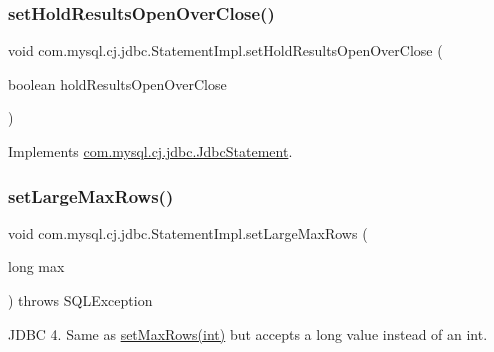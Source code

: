 \subsubsection{\texorpdfstring{set\+Hold\+Results\+Open\+Over\+Close()}{setHoldResultsOpenOverClose()}}
{\footnotesize\ttfamily void com.\+mysql.\+cj.\+jdbc.\+Statement\+Impl.\+set\+Hold\+Results\+Open\+Over\+Close (\begin{DoxyParamCaption}\item[{boolean}]{hold\+Results\+Open\+Over\+Close }\end{DoxyParamCaption})}



Implements \mbox{\hyperlink{interfacecom_1_1mysql_1_1cj_1_1jdbc_1_1_jdbc_statement_acf4340a52d236d444fa9584b3f9cc43b}{com.\+mysql.\+cj.\+jdbc.\+Jdbc\+Statement}}.

\mbox{\label{classcom_1_1mysql_1_1cj_1_1jdbc_1_1_statement_impl_adcb9676c5158982c94c3213a11feeb17}} 
\subsubsection{\texorpdfstring{set\+Large\+Max\+Rows()}{setLargeMaxRows()}}
{\footnotesize\ttfamily void com.\+mysql.\+cj.\+jdbc.\+Statement\+Impl.\+set\+Large\+Max\+Rows (\begin{DoxyParamCaption}\item[{long}]{max }\end{DoxyParamCaption}) throws S\+Q\+L\+Exception}

J\+D\+BC 4. Same as \mbox{\hyperlink{classcom_1_1mysql_1_1cj_1_1jdbc_1_1_statement_impl_ab0226070ba29ae3c0cf7431d7b902c01}{set\+Max\+Rows(int)}} but accepts a long value instead of an int. \mbox{\label{classcom_1_1mysql_1_1cj_1_1jdbc_1_1_statement_impl_a398ed93fc7171fac680cd867a87cbf23}} 
